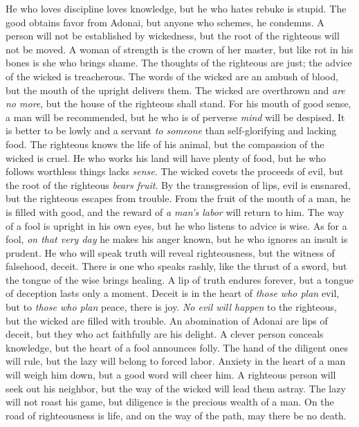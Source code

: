 \begin{biblechapter} %
\verse He who loves discipline loves knowledge, 
but he who hates rebuke is stupid.
\verse The good obtains favor from Adonai, 
but anyone who schemes, he condemns.
\verse A person will not be established by wickedness, 
but the root of the righteous will not be moved.
\verse A woman of strength is the crown of her master, 
but like rot in his bones is she who brings shame.
\verse The thoughts of the righteous are just; 
the advice of the wicked is treacherous.
\verse The words of the wicked are an ambush of blood, 
but the mouth of the upright delivers them.
\verse The wicked are overthrown and \textit{are no more}, 
but the house of the righteous shall stand.
\verse For his mouth of good sense, a man will be recommended, 
but he who is of perverse \textit{mind} will be despised.
\verse It is better to be lowly and a servant \textit{to someone} 
than self-glorifying and lacking food.
\verse The righteous knows the life of his animal, 
but the compassion of the wicked is cruel.
\verse He who works his land will have plenty of food, 
but he who follows worthless things lacks \textit{sense}.
\verse The wicked covets the proceeds of evil, 
but the root of the righteous \textit{bears fruit}.
\verse By the transgression of lips, evil is ensnared, 
but the righteous escapes from trouble.
\verse From the fruit of the mouth of a man, he is filled with good, 
and the reward of \textit{a man’s labor} will return to him.
\verse The way of a fool is upright in his own eyes, 
but he who listens to advice is wise.
\verse As for a fool, \textit{on that very day} he makes his anger known, 
but he who ignores an insult is prudent.
\verse He who will speak truth will reveal righteousness, 
but the witness of falsehood, deceit.
\verse There is one who speaks rashly, like the thrust of a sword, 
but the tongue of the wise brings healing.
\verse A lip of truth endures forever, 
but a tongue of deception lasts only a moment.
\verse Deceit is in the heart of \textit{those who plan} evil, 
but to \textit{those who plan} peace, there is joy.
\verse \textit{No evil will happen} to the righteous, 
but the wicked are filled with trouble.
\verse An abomination of Adonai are lips of deceit, 
but they who act faithfully are his delight.
\verse A clever person conceals knowledge, 
but the heart of a fool announces folly.
\verse The hand of the diligent ones will rule, 
but the lazy will belong to forced labor.
\verse Anxiety in the heart of a man will weigh him down, 
but a good word will cheer him.
\verse A righteous person will seek out his neighbor, 
but the way of the wicked will lead them astray.
\verse The lazy will not roast his game, 
but diligence is the precious wealth of a man.
\verse On the road of righteousness is life, 
and on the way of the path, may there be no death.
\end{biblechapter}

